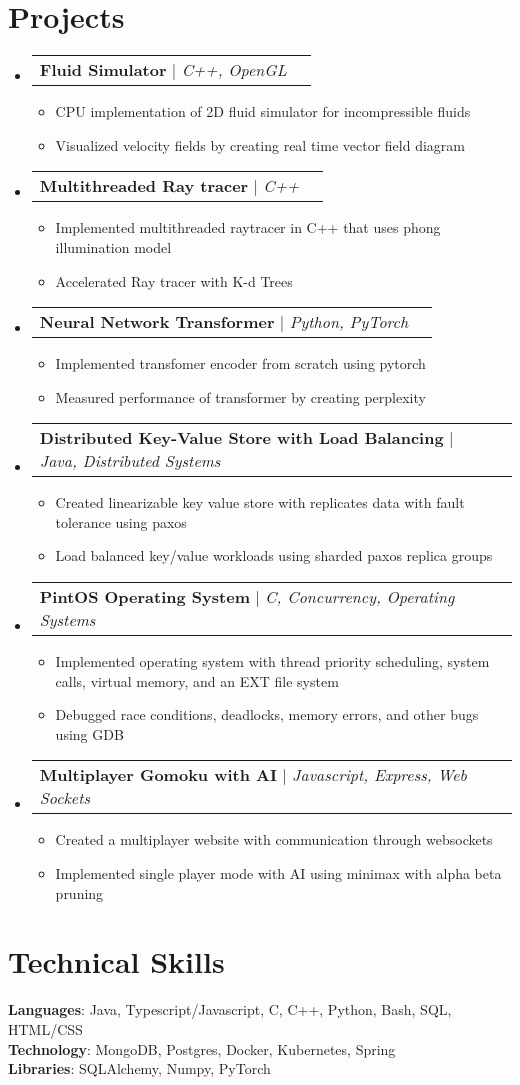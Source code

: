 \documentclass[letterpaper,11pt]{article}
\makeatletter
\newcommand{\resumeItem}[1]{
  \item\small{
    {#1 \vspace{-2pt}}
  }
}
\newcommand{\resumeProjectHeading}[2]{
    \item
    \begin{tabular*}{0.97\textwidth}{l@{\extracolsep{\fill}}r}
      \small#1 & #2 \\
    \end{tabular*}\vspace{-7pt}
}
\newcommand{\resumeSubHeadingListStart}{\begin{itemize}[leftmargin=0.15in, label={}]}
\newcommand{\resumeSubHeadingListEnd}{\end{itemize}}
\newcommand{\resumeItemListStart}{\begin{itemize}}
\newcommand{\resumeItemListEnd}{\end{itemize}\vspace{-5pt}}
\makeatother
\begin{document}
\section{Projects}
    \resumeSubHeadingListStart
      \resumeProjectHeading
          {\textbf{Fluid Simulator} $|$ \emph{C++, OpenGL}}{}
          \resumeItemListStart
            \resumeItem{CPU implementation of 2D fluid simulator for incompressible fluids}
            \resumeItem{Visualized velocity fields by creating real time vector field diagram}
          \resumeItemListEnd
      \resumeProjectHeading
          {\textbf{Multithreaded Ray tracer} $|$ \emph{C++}}{}
          \resumeItemListStart
            \resumeItem{Implemented multithreaded raytracer in C++ that uses phong illumination model}
            \resumeItem{Accelerated Ray tracer with K-d Trees}
          \resumeItemListEnd
      \resumeProjectHeading
          {\textbf{Neural Network Transformer} $|$ \emph{Python, PyTorch}}{}
          \resumeItemListStart
            \resumeItem{Implemented transfomer encoder from scratch using pytorch}
            \resumeItem{Measured performance of transformer by creating perplexity}
          \resumeItemListEnd
      \resumeProjectHeading
          {\textbf{Distributed Key-Value Store with Load Balancing} $|$ \emph{Java, Distributed Systems}}{}
          \resumeItemListStart
            \resumeItem{Created linearizable key value store with replicates data with fault tolerance using paxos}
            \resumeItem{Load balanced key/value workloads using sharded paxos replica groups}
          \resumeItemListEnd
      \resumeProjectHeading
          {\textbf{PintOS Operating System} $|$ \emph{C, Concurrency, Operating Systems}}{}
          \resumeItemListStart
            \resumeItem{Implemented operating system with thread priority scheduling, system calls, virtual memory, and an EXT file system}
            \resumeItem{Debugged race conditions, deadlocks, memory errors, and other bugs using GDB}
          \resumeItemListEnd
      \resumeProjectHeading
          {\textbf{Multiplayer Gomoku with AI} $|$ \emph{Javascript, Express, Web Sockets}}{}
          \resumeItemListStart
            \resumeItem{Created a multiplayer website with communication through websockets}
            \resumeItem{Implemented single player mode with AI using minimax with alpha beta pruning}
          \resumeItemListEnd
    \resumeSubHeadingListEnd



%
\section{Technical Skills}
 \begin{itemize}[leftmargin=0.15in, label={}]
    \small{\item{
     \textbf{Languages}{: Java, Typescript/Javascript, C, C++, Python, Bash, SQL, HTML/CSS} \\
     \textbf{Technology}{: MongoDB, Postgres, Docker, Kubernetes, Spring} \\
     \textbf{Libraries}{: SQLAlchemy, Numpy, PyTorch}
    }}
 \end{itemize}
\end{document}
